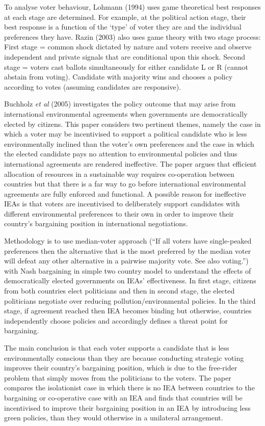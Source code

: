 \documentclass[11pt,preprint, authoryear]{elsarticle}
\numberwithin{equation}{section}
\numberwithin{figure}{section}
\numberwithin{table}{section}
\begin{document}
To analyse voter behaviour, Lohmann (1994) uses game theoretical best
responses at each stage are determined. For example, at the political
action stage, their best response is a function of the `type' of voter
they are and the individual preferences they have. Razin (2003) also
uses game theory with two stage process: First stage = common shock
dictated by nature and voters receive and observe independent and
private signals that are conditional upon this shock. Second stage =
voters cast ballots simultaneously for either candidate L or R (cannot
abstain from voting). Candidate with majority wins and chooses a policy
according to votes (assuming candidates are responsive).

Buchholz \emph{et al} (2005) investigates the policy outcome that may
arise from international environmental agreements when governments are
democratically elected by citizens. This paper considers two pertinent
themes, namely the case in which a voter may be incentivised to support
a political candidate who is less environmentally inclined than the
voter's own preferences and the case in which the elected candidate pays
no attention to environmental policies and thus international agreements
are rendered ineffective. The paper argues that efficient allocation of
resources in a sustainable way requires co-operation between countries
but that there is a far way to go before international environmental
agreements are fully enforced and functional. A possible reason for
ineffective IEAs is that voters are incentivised to deliberately support
candidates with different environmental preferences to their own in
order to improve their country's bargaining position in international
negotiations.

Methodology is to use median-voter approach (``If all voters have
single-peaked preferences then the alternative that is the most
preferred by the median voter will defeat any other alternative in a
pairwise majority vote. See also voting.'') with Nash bargaining in
simple two country model to understand the effects of democratically
elected governments on IEAs' effectiveness. In first stage, citizens
from both countries elect politicians and then in second stage, the
elected politicians negotiate over reducing pollution/environmental
policies. In the third stage, if agreement reached then IEA becomes
binding but otherwise, countries independently choose policies and
accordingly defines a threat point for bargaining.

The main conclusion is that each voter supports a candidate that is less
environmentally conscious than they are because conducting strategic
voting improves their country's bargaining position, which is due to the
free-rider problem that simply moves from the politicians to the voters.
The paper compares the isolationist case in which there is no IEA
between countries to the bargaining or co-operative case with an IEA and
finds that countries will be incentivised to improve their bargaining
position in an IEA by introducing less green policies, than they would
otherwise in a unilateral arrangement.
\end{document}
